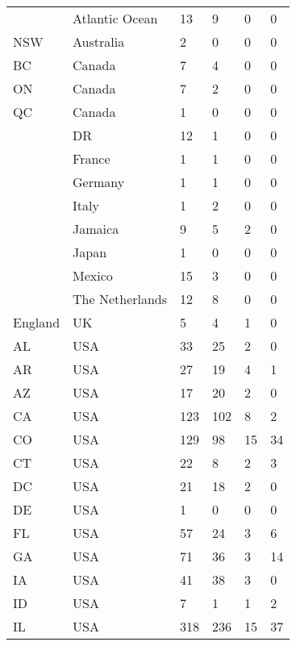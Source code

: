 \begin{supertabular}{llllll}
         &   Atlantic Ocean &   13 &    9 &   0 &   0 \\
     NSW &        Australia &    2 &    0 &   0 &   0 \\
      BC &           Canada &    7 &    4 &   0 &   0 \\
      ON &           Canada &    7 &    2 &   0 &   0 \\
      QC &           Canada &    1 &    0 &   0 &   0 \\
         &               DR &   12 &    1 &   0 &   0 \\
         &           France &    1 &    1 &   0 &   0 \\
         &          Germany &    1 &    1 &   0 &   0 \\
         &            Italy &    1 &    2 &   0 &   0 \\
         &          Jamaica &    9 &    5 &   2 &   0 \\
         &            Japan &    1 &    0 &   0 &   0 \\
         &           Mexico &   15 &    3 &   0 &   0 \\
         &  The Netherlands &   12 &    8 &   0 &   0 \\
 England &               UK &    5 &    4 &   1 &   0 \\
      AL &              USA &   33 &   25 &   2 &   0 \\
      AR &              USA &   27 &   19 &   4 &   1 \\
      AZ &              USA &   17 &   20 &   2 &   0 \\
      CA &              USA &  123 &  102 &   8 &   2 \\
      CO &              USA &  129 &   98 &  15 &  34 \\
      CT &              USA &   22 &    8 &   2 &   3 \\
      DC &              USA &   21 &   18 &   2 &   0 \\
      DE &              USA &    1 &    0 &   0 &   0 \\
      FL &              USA &   57 &   24 &   3 &   6 \\
      GA &              USA &   71 &   36 &   3 &  14 \\
      IA &              USA &   41 &   38 &   3 &   0 \\
      ID &              USA &    7 &    1 &   1 &   2 \\
      IL &              USA &  318 &  236 &  15 &  37 \\

\end{supertabular}
